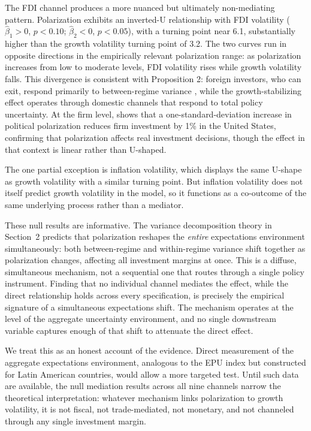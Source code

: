 \documentclass[12pt]{article}
\begin{document}
The FDI channel produces a more nuanced but ultimately non-mediating
pattern. Polarization exhibits an inverted-U relationship with FDI
volatility ($\hat{\beta}_1 > 0$, $p < 0.10$; $\hat{\beta}_2 < 0$,
$p < 0.05$), with a turning point near 6.1, substantially higher than the
growth volatility turning point of 3.2. The two curves run in opposite
directions in the empirically relevant polarization range: as polarization
increases from low to moderate levels, FDI volatility rises while growth
volatility falls. This divergence is consistent with Proposition 2: foreign
investors, who can exit, respond primarily to between-regime variance
\citep{KokashviliBarbakadze2020}, while the growth-stabilizing effect
operates through domestic channels that respond to total policy uncertainty.
At the firm level, \citet{Zhu2024} shows that a one-standard-deviation
increase in political polarization reduces firm investment by 1\% in the
United States, confirming that polarization affects real investment
decisions, though the effect in that context is linear rather than
U-shaped.

The one partial exception is inflation volatility, which displays the same
U-shape as growth volatility with a similar turning point. But inflation
volatility does not itself predict growth volatility in the model, so it
functions as a co-outcome of the same underlying process rather than
a mediator.

These null results are informative. The variance decomposition theory in
Section~2 predicts that polarization reshapes the \textit{entire}
expectations environment simultaneously: both between-regime and
within-regime variance shift together as polarization changes, affecting
all investment margins at once. This is a diffuse, simultaneous mechanism,
not a sequential one that routes through a single policy instrument. Finding
that no individual channel mediates the effect, while the direct
relationship holds across every specification, is precisely the
empirical signature of a simultaneous expectations shift. The mechanism
operates at the level of the aggregate uncertainty environment, and no
single downstream variable captures enough of that shift to attenuate
the direct effect.

We treat this as an honest account of the evidence. Direct measurement of
the aggregate expectations environment, analogous to the
\citet{Baker2016} EPU index but constructed for Latin American
countries, would allow a more targeted test. Until such data are available,
the null mediation results across all nine channels narrow the theoretical
interpretation: whatever mechanism links polarization to growth volatility,
it is not fiscal, not trade-mediated, not monetary, and not channeled
through any single investment margin.
\end{document}
